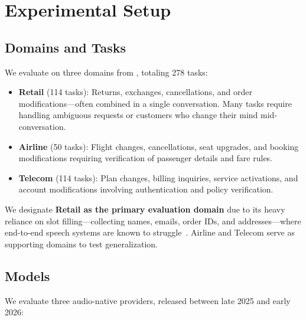 \section{Experimental Setup}
\label{sec:experiments}

\subsection{Domains and Tasks}

We evaluate on three domains from \tautwobench{}, totaling 278 tasks:
\begin{itemize}[nosep,leftmargin=*]
    \item \textbf{Retail} (114 tasks): Returns, exchanges, cancellations, and order modifications---often combined in a single conversation. Many tasks require handling ambiguous requests or customers who change their mind mid-conversation.
    \item \textbf{Airline} (50 tasks): Flight changes, cancellations, seat upgrades, and booking modifications requiring verification of passenger details and fare rules.
    \item \textbf{Telecom} (114 tasks): Plan changes, billing inquiries, service activations, and account modifications involving authentication and policy verification.
\end{itemize}
We designate \textbf{Retail as the primary evaluation domain} due to its heavy reliance on slot filling---collecting names, emails, order IDs, and addresses---where end-to-end speech systems are known to struggle~\citep{li_cb-whisper_2024, si_spokenwoz_2025}. Airline and Telecom serve as supporting domains to test generalization.

\subsection{Models}

We evaluate three audio-native providers, released between late 2025 and early 2026:

\begin{table}[h]
\caption{Audio-native models evaluated.}
\label{tab:models}
\centering
\begin{small}
\end{small}
\end{table}

